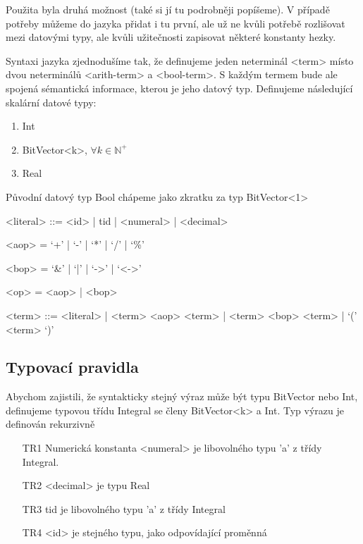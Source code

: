 \documentclass[10pt,a4paper,notitlepage]{report}
\begin{document}
Použita byla druhá možnost (také si jí tu podrobněji popíšeme). V případě potřeby můžeme do jazyka přidat i tu první, ale už ne kvůli potřebě rozlišovat mezi datovými typy, ale kvůli užitečnosti zapisovat některé konstanty hezky.

Syntaxi jazyka zjednodušíme tak, že definujeme jeden neterminál <term> místo dvou neterminálů <arith-term> a <bool-term>. S každým termem bude ale spojená sémantická informace, kterou je jeho datový typ. Definujeme následující skalární datové typy:

\begin{enumerate}
\item Int
\item BitVector<k>, $\forall k \in \mathbb{N^+}$
\item Real
\end{enumerate}

Původní datový typ Bool chápeme jako zkratku za typ BitVector<1>

\begin{grammar}
<literal> ::= <id> | tid | <numeral> | <decimal>

<aop> = `+'  | `-' | `*' | `/' |  `\%'

<bop> = `&' | `|' | `->' | `<->'

<op> = <aop> | <bop>

<term> ::= <literal> | <term> <aop> <term> | <term> <bop> <term> | `(' <term> `)'
\end{grammar}

\subsection{Typovací pravidla}
Abychom zajistili, že syntakticky stejný výraz může být typu BitVector nebo Int, definujeme typovou třídu Integral se členy BitVector<k> a Int. Typ výrazu je definován rekurzivně

\begin{enumerate}
\item[TR1] Numerická konstanta <numeral> je libovolného typu 'a' z třídy Integral.
\item[TR2] <decimal> je typu Real
\item[TR3] tid je libovolného typu 'a' z třídy Integral
\item[TR4] <id> je stejného typu, jako odpovídající proměnná
\end{enumerate}
\end{document}

